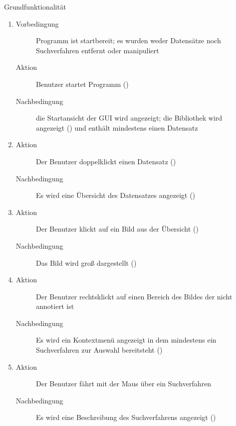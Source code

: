 \begin{description} %
	\item[] Grundfunktionalität %
	\begin{enumerate}
		\item
		\begin{description}
			\item[Vorbedingung] Programm ist startbereit; es wurden weder Datensätze noch Suchverfahren entfernt oder manipuliert
			\item[Aktion] Benutzer startet Programm ()
			\item[Nachbedingung] die Startansicht der GUI wird angezeigt; die Bibliothek wird angezeigt () und enthält mindestens einen Datensatz
		\end{description}
		\item
		\begin{description}
			\item[Aktion] Der Benutzer doppelklickt einen Datensatz ()
			\item[Nachbedingung] Es wird eine Übersicht des Datensatzes angezeigt ()
		\end{description}
		\item
		\begin{description}
			\item[Aktion] Der Benutzer klickt auf ein Bild aus der Übersicht ()
			\item[Nachbedingung] Das Bild wird groß dargestellt ()
		\end{description}
		\item
		\begin{description}
			\item[Aktion] Der Benutzer rechtsklickt auf einen Bereich des Bildes der nicht annotiert ist
			\item[Nachbedingung] Es wird ein Kontextmenü angezeigt in dem mindestens ein Suchverfahren zur Auswahl bereitsteht ()
		\end{description}
		\item
		\begin{description}
			\item[Aktion] Der Benutzer fährt mit der Maus über ein Suchverfahren
			\item[Nachbedingung] Es wird eine Beschreibung des Suchverfahrens angezeigt ()

\end{description}
\end{enumerate}
\end{description}

